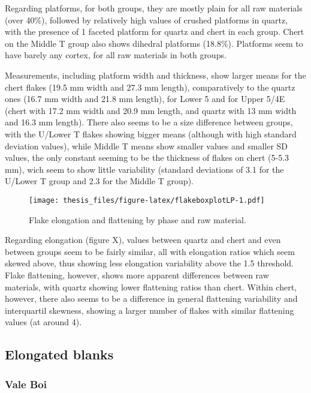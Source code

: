 \documentclass[12pt,twoside]{reedthesis}
\begin{document}
Regarding platforms, for both groups, they are mostly plain for all raw materials (over 40\%), followed by relatively high values of crushed platforms in quartz, with the presence of 1 faceted platform for quartz and chert in each group. Chert on the Middle T group also shows dihedral platforms (18.8\%). Platforms seem to have barely any cortex, for all raw materials in both groups.

Measurements, including platform width and thickness, show larger means for the chert flakes (19.5 mm width and 27.3 mm length), comparatively to the quartz ones (16.7 mm width and 21.8 mm length), for Lower 5 and for Upper 5/4E (chert with 17.2 mm width and 20.9 mm length, and quartz with 13 mm width and 16.3 mm length). There also seems to be a size difference between groups, with the U/Lower T flakes showing bigger means (although with high standard deviation values), while Middle T means show smaller values and smaller SD values, the only constant seeming to be the thickness of flakes on chert (5-5.3 mm), wich seem to show little variability (standard deviations of 3.1 for the U/Lower T group and 2.3 for the Middle T group).
\begin{figure}
\centering
\texttt{[image: thesis\_files/figure-latex/flakeboxplotLP-1.pdf]}
\caption{\label{fig:flakeboxplotLP}Flake elongation and flattening by phase and raw material.}
\end{figure}
Regarding elongation (figure X), values between quartz and chert and even between groups seem to be fairly similar, all with elongation ratios which seem skewed above, thus showing less elongation variability above the 1.5 threshold. Flake flattening, however, shows more apparent differences between raw materials, with quartz showing lower flattening ratios than chert. Within chert, however, there also seems to be a difference in general flattening variability and interquartil skewness, showing a larger number of flakes with similar flattening values (at around 4).

\hypertarget{elongated-blanks}{%
\subsection{Elongated blanks}\label{elongated-blanks}}

\hypertarget{vale-boi-6}{%
\subsubsection{Vale Boi}\label{vale-boi-6}}
\end{document}
